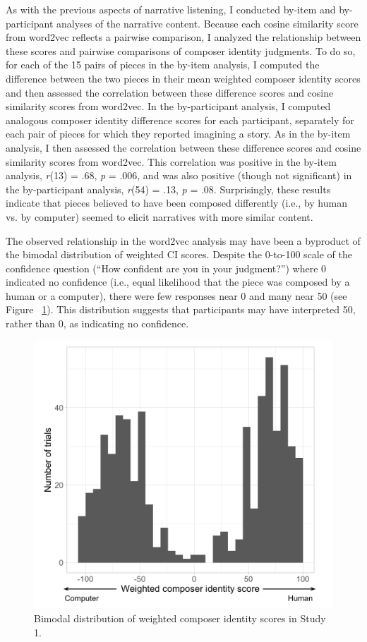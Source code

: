 \documentclass[12pt,twoside]{reedthesis}
\begin{document}
As with the previous aspects of narrative listening, I conducted by-item and by-participant analyses of the narrative content. Because each cosine similarity score from word2vec reflects a pairwise comparison, I analyzed the relationship between these scores and pairwise comparisons of composer identity judgments. To do so, for each of the 15 pairs of pieces in the by-item analysis, I computed the difference between the two pieces in their mean weighted composer identity scores and then assessed the correlation between these difference scores and cosine similarity scores from word2vec. In the by-participant analysis, I computed analogous composer identity difference scores for each participant, separately for each pair of pieces for which they reported imagining a story. As in the by-item analysis, I then assessed the correlation between these difference scores and cosine similarity scores from word2vec. This correlation was positive in the by-item analysis, \emph{r}(13) = .68, \emph{p} = .006, and was also positive (though not significant) in the by-participant analysis, \emph{r}(54) = .13, \emph{p} = .08. Surprisingly, these results indicate that pieces believed to have been composed differently (i.e., by human vs. by computer) seemed to elicit narratives with more similar content. 

The observed relationship in the word2vec analysis may have been a byproduct of the bimodal distribution of weighted CI scores. Despite the 0-to-100 scale of  the confidence question (“How confident are you in your judgment?”) where 0 indicated no confidence (i.e., equal likelihood that the piece was composed by a human or a computer), there were few responses near 0 and many near 50 (see Figure ~\ref*{fig-bimodal-dist}). This distribution suggests that participants may have interpreted 50, rather than 0, as indicating no confidence. 

\begin{figure}[h!tbp]
	\centering
	\includegraphics[scale=0.5]{weighted_dist.png}
	\caption{Bimodal distribution of weighted composer identity scores in Study 1.}
	\label{fig-bimodal-dist}
\end{figure}
\end{document}
